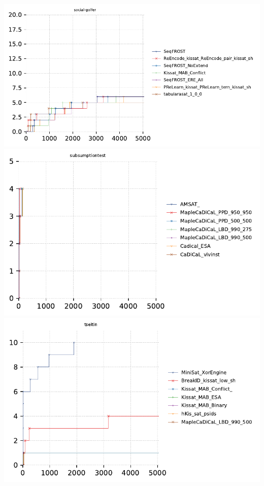 \documentclass{article}
\begin{document}
\includegraphics[width=\linewidth]{gen/sc2023/cdfs/cdf-social-golfer.pdf}
\includegraphics[width=\linewidth]{gen/sc2023/cdfs/cdf-subsumptiontest.pdf}
\includegraphics[width=\linewidth]{gen/sc2023/cdfs/cdf-tseitin.pdf}
\end{document}
